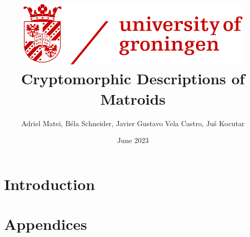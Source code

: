 \documentclass{article}
\title{ {\includegraphics[scale=0.5]{rug_logo.png}}\\
    \vspace{2cm}
    {Cryptomorphic Descriptions of Matroids} 
    }
\author{Adriel Matei, Béla Schneider, Javier Gustavo Vela Castro, Juš Kocutar}
\date{June 2023}
\theoremstyle{plain}
\theoremstyle{definition}
\theoremstyle{remark}
\numberwithin{equation}{section}
\begin{document}
\maketitle


\newpage

\tableofcontents

\newpage
\section{Introduction}












\newpage



\renewcommand{\thesubsection}{\Alph{subsection}}
\newpage
\section{Appendices}
\begin{appendices}
    
    \newpage
\end{appendices}
\end{document}
